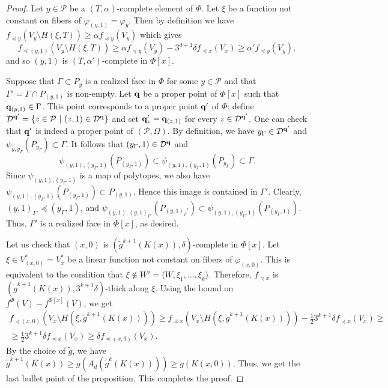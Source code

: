 \documentclass{daj}
\renewcommand{\ge}{\geqslant}
\newcommand{\D}{\mathcal D}
\renewcommand{\P}{\mathcal P}
\theoremstyle{definition}
\theoremstyle{remark}
\theoremstyle{definition}
\theoremstyle{definition}
\begin{document}
\begin{proof}
Let $y \in \P$ be a $(T, \alpha)$-complete element of $\Phi$. Let $\xi$ be a function not constant on fibers of $\varphi_{(y, 1)} = \varphi_y$. Then by definition we have $f_{\preceq y}(V_y \setminus H(\xi, T)) \ge \alpha f_{\preceq y}(V_y)$ which gives 
$$
f_{\preceq (y, 1)}(V_y \setminus H(\xi, T)) \ge \alpha f_{\preceq y}(V_y) - 3^{d+1}\delta f_{\preceq x}(V_x) \ge \alpha' f_{\preceq y}(V_y),
$$
and so $(y, 1)$ is $(T, \alpha')$-complete in $\Phi[x]$. 

Suppose that $\Gamma \subset P_y$ is a realized face in $\Phi$ for some $y\in \P$ and that $\Gamma' =\Gamma \cap P_{(y, 1)}$ is non-empty. Let ${\bf q}$ be a proper point of $\Phi[x]$ such that ${\bf q}_{(y, 1)} \in \Gamma$. This point corresponds to a proper point ${\bf q}'$ of $\Phi$: define $\D^{{\bf q}'} = \{z \in \P ~|~ (z, 1) \in \D^{{\bf q}}\}$ and set ${\bf q}'_z = {\bf q}_{(z, 1)}$ for every $z \in \D^{{\bf q}'}$. One can check that ${\bf q}'$ is indeed a proper point of $(\P, \Omega)$. By definition, we have $y_\Gamma \in \D^{{\bf q}'}$ and $\psi_{y,y_{\Gamma}}(P_{y_\Gamma}) \subset \Gamma$. It follows that $(y_\Gamma,1) \in \D^{{\bf q}}$ and 
\[
\psi_{(y,1), (y_\Gamma, 1)}(P_{(y_\Gamma,1)}) \subset \psi_{(y,1), (y_\Gamma, 1)}(P_{y_\Gamma}) \subset \Gamma.
\]
Since $\psi_{(y,1), (y_\Gamma, 1)}$ is a map of polytopes, we also have $\psi_{(y,1), (y_\Gamma, 1)}(P_{(y_\Gamma,1)}) \subset P_{(y,1)}$. Hence this image is contained in $\Gamma'$. Clearly, $(y, 1)_{\Gamma'} \preceq (y_\Gamma,1)$, and $\psi_{(y,1), (y, 1)_{\Gamma'}}(P_{(y,1)_\Gamma'}) \subset \psi_{(y,1), (y_\Gamma, 1)}(P_{(y_\Gamma,1)})$. Thus, $\Gamma'$ is a realized face in $\Phi[x]$, as desired.

Let us check that $(x, 0)$ is $(\tilde g^{k+1}(K(x)), \delta)$-complete in $\Phi[x]$. Let $\xi \in V^*_{(x, 0)} = V^*_x$ be a linear function not constant on fibers of $\varphi_{(x, 0)}$. This is equivalent to the condition that $\xi \not \in W' = \langle W, \xi_1, \ldots, \xi_k\rangle$. Therefore, $f_{\preceq x}$ is $(\tilde g^{k+1}(K(x)), 3^{k+1}\delta)$-thick along $\xi$. Using the bound on $f^{\Phi}(V) - f^{\Phi[x]}(V)$, we get
\begin{align*}
f_{\preceq (x, 0)}(V_x \setminus H(\xi, \tilde g^{k+1}(K(x)))) \ge f_{\preceq x}(V_x \setminus H(\xi, \tilde g^{k+1}(K(x)))) - \frac12 3^{k+1}\delta f_{\preceq x}(V_x) \ge\\
\ge \frac12 3^{k+1} \delta f_{\preceq x}(V_x) \ge \delta f_{\preceq (x,0)}(V_x).
\end{align*}
By the choice of $\tilde g$, we have $\tilde g^{k+1}(K(x))  \ge g ( A_d(\tilde g^k(K(x))) ) \ge g(K(x,0)) $. Thus, we get the last bullet point of the proposition. This completes the proof.
\end{proof}
\end{document}
